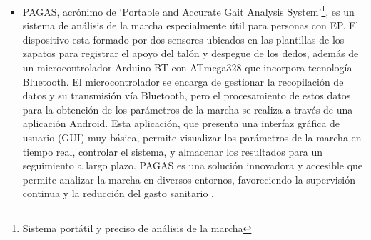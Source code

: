 \begin{itemize}
    \item PAGAS, acrónimo de `Portable and Accurate Gait Analysis System'\footnote{Sistema portátil y preciso de análisis de la marcha}, es un sistema de análisis de la marcha especialmente útil para personas con EP. El dispositivo esta formado por dos sensores ubicados en las plantillas de los zapatos para registrar el apoyo del talón y despegue de los dedos, además de un microcontrolador Arduino BT con ATmega328 que incorpora tecnología Bluetooth. El microcontrolador se encarga de gestionar la recopilación de datos y su transmisión vía Bluetooth, pero el procesamiento de estos datos para la obtención de los parámetros de la marcha se realiza a través de una aplicación Android. Esta aplicación, que presenta una interfaz gráfica de usuario (GUI) muy básica, permite visualizar los parámetros de la marcha en tiempo real, controlar el sistema, y almacenar los resultados para un seguimiento a largo plazo. PAGAS es una solución innovadora y accesible que permite analizar la marcha en diversos entornos, favoreciendo la supervisión continua y la reducción del gasto sanitario \cite{pagas}.
\end{itemize}

